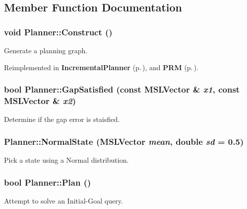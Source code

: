 \subsection{Member Function Documentation}
\subsubsection{\setlength{\rightskip}{0pt plus 5cm}void Planner::Construct ()\hspace{0.3cm}{\tt  [pure virtual]}}\label{classPlanner_a3}


Generate a planning graph.



Reimplemented in {\bf Incremental\-Planner} {\rm (p.\,\pageref{classIncrementalPlanner_a2})}, and {\bf PRM} {\rm (p.\,\pageref{classPRM_a2})}.
\subsubsection{\setlength{\rightskip}{0pt plus 5cm}bool Planner::Gap\-Satisfied (const {\bf MSLVector} \& {\em x1}, const {\bf MSLVector} \& {\em x2})}\label{classPlanner_a7}


Determine if the gap error is staisfied.

\subsubsection{ Planner::Normal\-State ({\bf MSLVector} {\em mean}, double {\em sd} = 0.5)\hspace{0.3cm}{\tt  [protected]}}\label{classPlanner_b1}


Pick a state using a Normal distribution.

\subsubsection{\setlength{\rightskip}{0pt plus 5cm}bool Planner::Plan ()\hspace{0.3cm}{\tt  [pure virtual]}}\label{classPlanner_a4}


Attempt to solve an Initial-Goal query.



